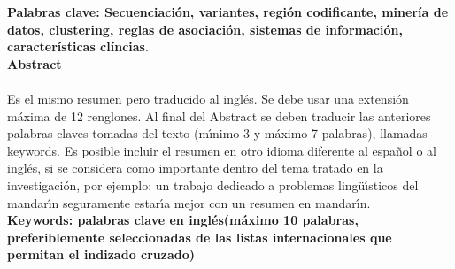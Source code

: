 \textbf{\small Palabras clave: Secuenciación, variantes, región codificante, minería de datos, clustering, reglas de asociación, sistemas de información, características clíncias}.\\


\textbf{\LARGE Abstract}\\\\
Es el mismo resumen pero traducido al ingl\'{e}s. Se debe usar una extensi\'{o}n m\'{a}xima de 12 renglones. Al final del Abstract se deben traducir las anteriores palabras claves tomadas del texto (m\'{\i}nimo 3 y m\'{a}ximo 7 palabras), llamadas keywords. Es posible incluir el resumen en otro idioma diferente al espa\~{n}ol o al ingl\'{e}s, si se considera como importante dentro del tema tratado en la investigaci\'{o}n, por ejemplo: un trabajo dedicado a problemas ling\"{u}\'{\i}sticos del mandar\'{\i}n seguramente estar\'{\i}a mejor con un resumen en mandar\'{\i}n.\\[2.0cm]
\textbf{\small Keywords: palabras clave en ingl\'{e}s(m\'{a}ximo 10 palabras, preferiblemente seleccionadas de las listas internacionales que permitan el indizado cruzado)}\\